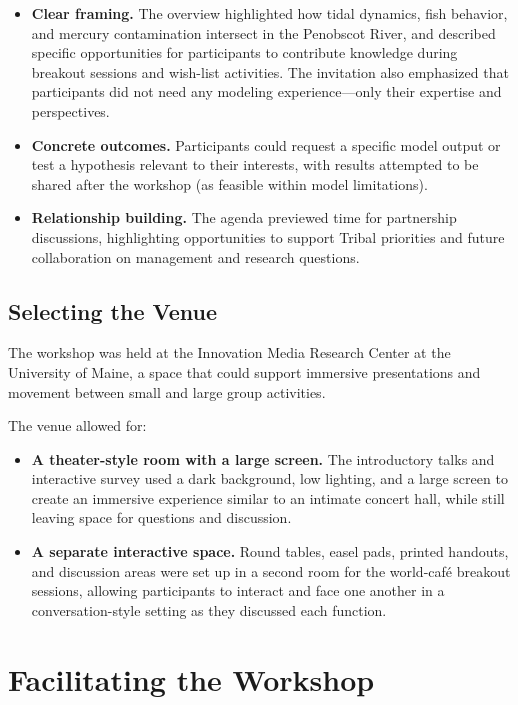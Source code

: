\documentclass[
]{book}
\begin{document}
\begin{itemize}
\item
  \textbf{Clear framing.} The overview highlighted how tidal dynamics, fish behavior, and mercury contamination intersect in the Penobscot River, and described specific opportunities for participants to contribute knowledge during breakout sessions and wish-list activities. The invitation also emphasized that participants did not need any modeling experience---only their expertise and perspectives.
\item
  \textbf{Concrete outcomes.} Participants could request a specific model output or test a hypothesis relevant to their interests, with results attempted to be shared after the workshop (as feasible within model limitations).
\item
  \textbf{Relationship building.} The agenda previewed time for partnership discussions, highlighting opportunities to support Tribal priorities and future collaboration on management and research questions.
\end{itemize}

\subsection{Selecting the Venue}\label{selecting-the-venue}

The workshop was held at the Innovation Media Research Center at the University of Maine, a space that could support immersive presentations and movement between small and large group activities.

The venue allowed for:

\begin{itemize}
\item
  \textbf{A theater-style room with a large screen.} The introductory talks and interactive survey used a dark background, low lighting, and a large screen to create an immersive experience similar to an intimate concert hall, while still leaving space for questions and discussion.
\item
  \textbf{A separate interactive space.} Round tables, easel pads, printed handouts, and discussion areas were set up in a second room for the world-café breakout sessions, allowing participants to interact and face one another in a conversation-style setting as they discussed each function.
\end{itemize}

\section{Facilitating the Workshop}\label{facilitating-the-workshop}
\end{document}
